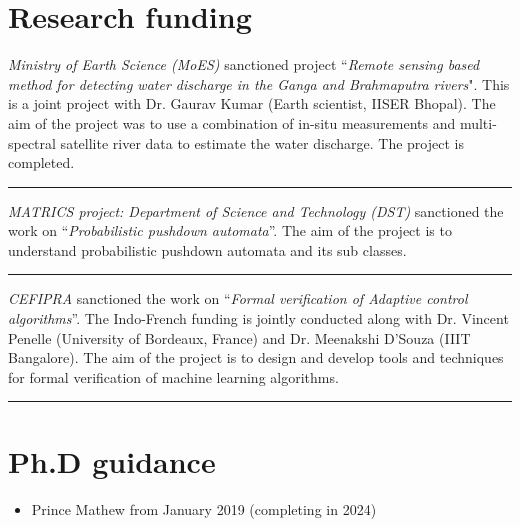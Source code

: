 \documentclass[margin]{res}
\begin{document}
\begin{resume}
				
\section{Research funding}
\emph{Ministry of Earth Science (MoES)} sanctioned project  ``\emph{Remote sensing based method for detecting water discharge in the Ganga and Brahmaputra rivers}". This is a joint project with Dr. Gaurav Kumar (Earth scientist, IISER Bhopal). The aim of the project was to use a combination of in-situ measurements and multi-spectral satellite river data to estimate the water discharge. The project is completed. \\
\noindent\rule{13cm}{0.4pt} 

\emph{MATRICS project: Department of Science and Technology (DST)} sanctioned the work on  ``\emph{Probabilistic pushdown automata}''. The aim of the project is to understand probabilistic pushdown automata and its sub classes. \\
\noindent\rule{13cm}{0.4pt} 

\emph{CEFIPRA} sanctioned the work on ``\emph{Formal verification of Adaptive control algorithms}''. The Indo-French funding is jointly conducted along with Dr. Vincent Penelle (University of Bordeaux, France) and Dr. Meenakshi D'Souza (IIIT Bangalore). The aim of the project is to design and develop tools and techniques for formal verification of machine learning algorithms. \\
\noindent\rule{13cm}{0.4pt} 


					
\renewcommand\labelitemi{$\cdot$}

\section{Ph.D guidance}
\begin{itemize}
 \item Prince Mathew from January 2019 (completing in 2024)
\end{itemize}



\end{resume}
\end{document}
